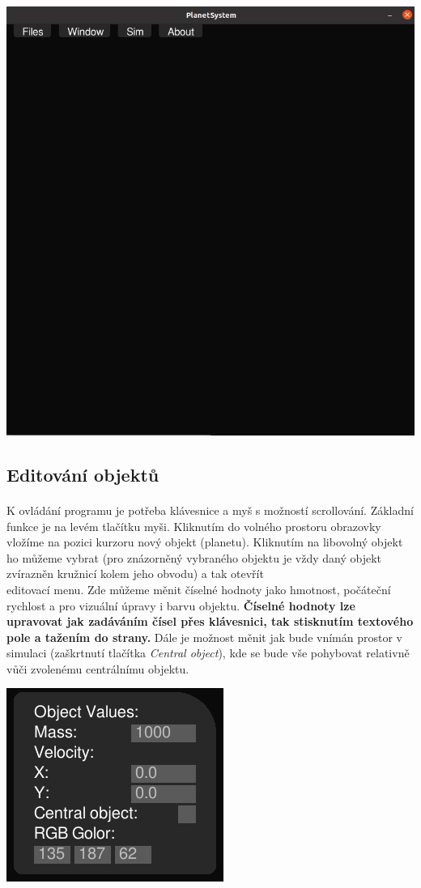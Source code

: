 \documentclass[a4paper, 12pt]{article}
\begin{document}
\vspace{0.5cm}
\begin{center}
\includegraphics[width=0.75\linewidth]{pics/p1_crop.png}
\end{center}

\newpage
\subsection{Editování objektů}
\paragraph{}
K ovládání programu je potřeba klávesnice a myš s možností scrollování.
Základní funkce je na levém tlačítku myši. Kliknutím do volného prostoru
obrazovky vložíme na pozici kurzoru nový objekt (planetu). Kliknutím na
libovolný objekt ho můžeme vybrat (pro znázorněný vybraného objektu je vždy
daný objekt zvírazněn kružnicí kolem jeho obvodu) a tak otevřít \\editovací
menu.  Zde můžeme měnit číselné hodnoty jako hmotnost, počáteční rychlost a pro
vizuální úpravy i barvu objektu. \textbf{Číselné hodnoty lze upravovat jak zadáváním
čísel přes klávesnici, tak stisknutím textového pole a tažením do strany.} Dále
je možnost měnit jak bude vnímán prostor v simulaci (zaškrtnutí tlačítka
\emph{Central object}), kde se bude vše pohybovat relativně vůči zvolenému
centrálnímu objektu.

\begin{center}
\includegraphics[width=0.6\linewidth]{pics/p2_crop.png}
\end{center}
\end{document}
